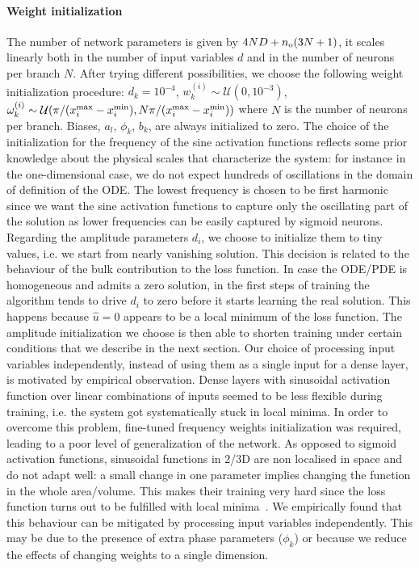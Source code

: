 \documentclass{article}
\newcommand{\mc}{\mathcal}
\begin{document}
\paragraph{Weight initialization}
The number of network parameters is given by $4ND + n_{\rm o} (3N + 1)$, it scales linearly both in the number of input variables $d$ and in the number of neurons per branch $N$. After trying different possibilities, we choose the following weight initialization procedure: $d_k=10^{-4}$, $w_k^{(i)}\sim \mc{U}(0,10^{-3})$, $\omega_k^{(i)}\sim \mc{U}(\pi/(x_i^{\rm max}-x_i^{\rm min}),N\pi/(x_i^{\rm max}-x_i^{\rm min}))$ where $N$ is the number of neurons per branch. Biases, $a_l$, $\phi_k$, $b_k$, are always initialized to zero. The choice of the initialization for the frequency of the sine activation functions reflects some prior knowledge about the physical scales that characterize the system: for instance in the one-dimensional case, we do not expect hundreds of oscillations in the domain of definition of the ODE. The lowest frequency is chosen to be first harmonic since we want the sine activation functions to capture only the oscillating part of the solution as lower frequencies can be easily captured by sigmoid neurons. Regarding the amplitude parameters $d_i$, we choose to initialize them to tiny values, i.e. we start from nearly vanishing solution. This decision is related to the behaviour of the bulk contribution to the loss function. In case the ODE/PDE is homogeneous and admits a zero solution, in the first steps of training the algorithm tends to drive $d_i$ to zero before it starts learning the real solution. This happens because $\hat{u}=0$ appears to be a local minimum of the loss function. The amplitude initialization we choose is then able to shorten training under certain conditions that we describe in the next section.
Our choice of processing input variables independently, instead of using them as a single input for a dense layer, is motivated by empirical observation. Dense layers with sinusoidal activation function over linear combinations of inputs seemed to be less flexible during training, i.e. the system got systematically stuck in local minima. In order to overcome this problem, fine-tuned frequency weights initialization was required, leading to a poor level of generalization of the network. As opposed to sigmoid activation functions, sinusoidal functions in 2/3D are non localised in space and do not adapt well: a small change in one parameter implies changing the function in the whole area/volume. This makes their training very hard since the loss function turns out to be fulfilled with local minima~\cite{819741, Parascandolo2016}. We empirically found that this behaviour can be mitigated by processing input variables independently. This may be due to the presence of extra phase parameters ($\phi_k$) or because we reduce the effects of changing weights to a single dimension. 
\end{document}
